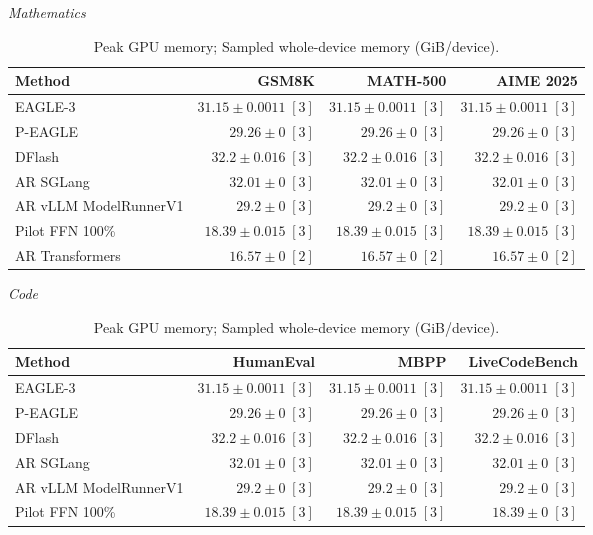 \documentclass[conference,onecolumn]{IEEEtran}
\begin{document}
\begin{table}[!htp]
\centering\small
\setlength{\tabcolsep}{3pt}
\caption{Peak GPU memory; Sampled whole-device memory (GiB/device).}
\label{tab:appendix-metric-memory-sampled-whole-device-memory-none}
\textit{Mathematics}\par\smallskip
\begin{tabular}{@{}>{\raggedright\arraybackslash}p{3.7cm}rrr@{}}
\toprule
Method & GSM8K & MATH-500 & AIME 2025 \\
\midrule
EAGLE-3 & \(31.15 \pm 0.0011\;[3]\) & \(31.15 \pm 0.0011\;[3]\) & \(31.15 \pm 0.0011\;[3]\) \\
P-EAGLE & \(29.26 \pm 0\;[3]\) & \(29.26 \pm 0\;[3]\) & \(29.26 \pm 0\;[3]\) \\
DFlash & \(32.2 \pm 0.016\;[3]\) & \(32.2 \pm 0.016\;[3]\) & \(32.2 \pm 0.016\;[3]\) \\
AR \textperiodcentered{} SGLang & \(32.01 \pm 0\;[3]\) & \(32.01 \pm 0\;[3]\) & \(32.01 \pm 0\;[3]\) \\
AR \textperiodcentered{} vLLM ModelRunnerV1 & \(29.2 \pm 0\;[3]\) & \(29.2 \pm 0\;[3]\) & \(29.2 \pm 0\;[3]\) \\
Pilot FFN 100\% & \(18.39 \pm 0.015\;[3]\) & \(18.39 \pm 0.015\;[3]\) & \(18.39 \pm 0.015\;[3]\) \\
AR \textperiodcentered{} Transformers & \(\mathbf{16.57} \pm 0\;[2]\) & \(\mathbf{16.57} \pm 0\;[2]\) & \(\mathbf{16.57} \pm 0\;[2]\) \\
\bottomrule
\end{tabular}\par\medskip
\textit{Code}\par\smallskip
\begin{tabular}{@{}>{\raggedright\arraybackslash}p{3.7cm}rrr@{}}
\toprule
Method & HumanEval & MBPP & LiveCodeBench \\
\midrule
EAGLE-3 & \(31.15 \pm 0.0011\;[3]\) & \(31.15 \pm 0.0011\;[3]\) & \(31.15 \pm 0.0011\;[3]\) \\
P-EAGLE & \(29.26 \pm 0\;[3]\) & \(29.26 \pm 0\;[3]\) & \(29.26 \pm 0\;[3]\) \\
DFlash & \(32.2 \pm 0.016\;[3]\) & \(32.2 \pm 0.016\;[3]\) & \(32.2 \pm 0.016\;[3]\) \\
AR \textperiodcentered{} SGLang & \(32.01 \pm 0\;[3]\) & \(32.01 \pm 0\;[3]\) & \(32.01 \pm 0\;[3]\) \\
AR \textperiodcentered{} vLLM ModelRunnerV1 & \(29.2 \pm 0\;[3]\) & \(29.2 \pm 0\;[3]\) & \(29.2 \pm 0\;[3]\) \\
Pilot FFN 100\% & \(18.39 \pm 0.015\;[3]\) & \(18.39 \pm 0.015\;[3]\) & \(18.39 \pm 0\;[3]\) \\

\end{tabular}
\end{table}
\end{document}
